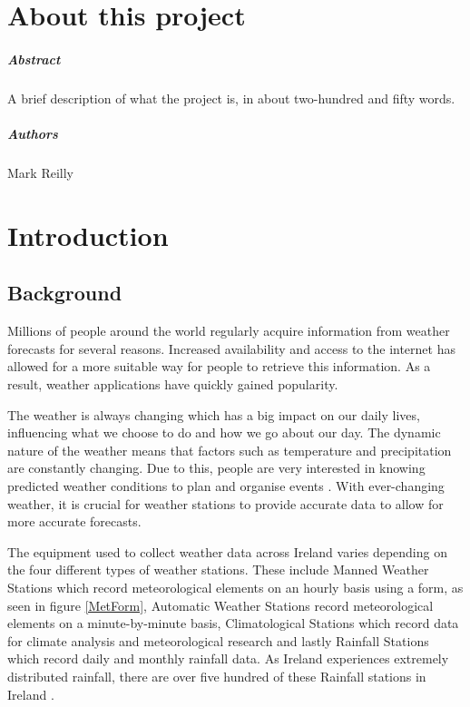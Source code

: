 
\chapter*{About this project}
\paragraph{Abstract}
A brief description of what the project is, in about two-hundred and fifty words.

\paragraph{Authors}
Mark Reilly



\chapter{Introduction}

\section{Background}
Millions of people around the world regularly acquire information from weather forecasts for several reasons. Increased availability and access to the internet has allowed for a more suitable way for people to retrieve this information. As a result, weather applications have quickly gained popularity.

The weather is always changing which has a big impact on our daily lives, influencing what we choose to do and how we go about our day. The dynamic nature of the weather means that factors such as temperature and precipitation are constantly changing. Due to this, people are very interested in knowing predicted weather conditions to plan and organise events \cite{WeatherontheGo}. With ever-changing weather, it is crucial for weather stations to provide accurate data to allow for more accurate forecasts. 

The equipment used to collect weather data across Ireland varies depending on the four different types of weather stations. These include Manned Weather Stations which record meteorological elements on an hourly basis using a form, as seen in figure \ref{MetForm}, Automatic Weather Stations record meteorological elements on a minute-by-minute basis, Climatological Stations which record data for climate analysis and meteorological research and lastly Rainfall Stations which record daily and monthly rainfall data. As Ireland experiences extremely distributed rainfall, there are over five hundred of these Rainfall stations in Ireland \cite{MET}.

